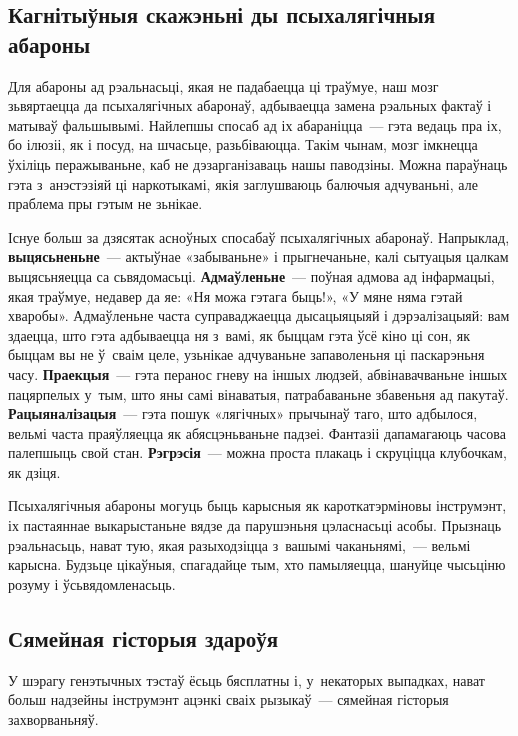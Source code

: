 \subsection*{Кагнітыўныя скажэньні ды псыхалягічныя абароны}

Для абароны ад рэальнасьці, якая не падабаецца ці траўмуе, наш мозг зьвяртаецца да псыхалягічных абаронаў, адбываецца замена рэальных фактаў і матываў фальшывымі. Найлепшы спосаб ад іх абараніцца~--- гэта ведаць пра іх, бо ілюзіі, як і посуд, на шчасьце, разьбіваюцца. Такім чынам, мозг імкнецца ўхіліць перажываньне, каб не дэзарганізаваць нашы паводзіны. Можна параўнаць гэта з~анэстэзіяй ці наркотыкамі, якія заглушваюць балючыя адчуваньні, але праблема пры гэтым не зьнікае.

Існуе больш за дзясятак асноўных спосабаў псыхалягічных абаронаў. Напрыклад, \textbf{выцясьненьне}~--- актыўнае «забываньне» і прыгнечаньне, калі сытуацыя цалкам выцясьняецца са сьвядомасьці. \textbf{Адмаўленьне}~--- поўная адмова ад інфармацыі, якая траўмуе, недавер да яе: «Ня можа гэтага быць!», «У мяне няма гэтай хваробы». Адмаўленьне часта суправаджаецца дысацыяцыяй і дэрэалізацыяй: вам здаецца, што гэта адбываецца ня з~вамі, як быццам гэта ўсё кіно ці сон, як быццам вы не ў~сваім целе, узьнікае адчуваньне запаволеньня ці паскарэньня часу. \textbf{Праекцыя}~--- гэта перанос гневу на іншых людзей, абвінавачваньне іншых пацярпелых у~тым, што яны самі вінаватыя, патрабаваньне збавеньня ад пакутаў. \textbf{Рацыяналізацыя}~--- гэта пошук «лягічных» прычынаў таго, што адбылося, вельмі часта праяўляецца як абясцэньваньне падзеі. Фантазіі дапамагаюць часова палепшыць свой стан. \textbf{Рэгрэсія}~--- можна проста плакаць і скруціцца клубочкам, як дзіця.

Псыхалягічныя абароны могуць быць карысныя як кароткатэрміновы інструмэнт, іх пастаяннае выкарыстаньне вядзе да парушэньня цэласнасьці асобы. Прызнаць рэальнасьць, нават тую, якая разыходзіцца з~вашымі чаканьнямі,~--- вельмі карысна. Будзьце цікаўныя, спагадайце тым, хто памыляецца, шануйце чысьціню розуму і ўсьвядомленасьць.

\subsection*{Сямейная гісторыя здароўя}

У шэрагу генэтычных тэстаў ёсьць бясплатны і, у~некаторых выпадках, нават больш надзейны інструмэнт ацэнкі сваіх рызыкаў~--- сямейная гісторыя захворваньняў. 



